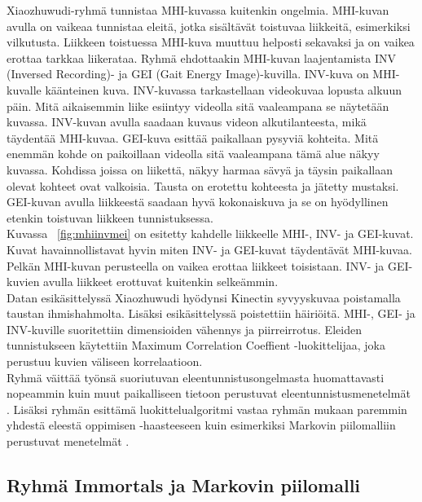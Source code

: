 Xiaozhuwudi-ryhmä tunnistaa MHI-kuvassa kuitenkin ongelmia. MHI-kuvan avulla on vaikeaa tunnistaa eleitä, jotka sisältävät toistuvaa liikkeitä, 
esimerkiksi vilkutusta.
Liikkeen toistuessa MHI-kuva muuttuu helposti sekavaksi ja on vaikea erottaa tarkkaa liikerataa. Ryhmä ehdottaakin MHI-kuvan laajentamista 
INV (Inversed Recording)- ja GEI (Gait Energy Image)-kuvilla. INV-kuva on MHI-kuvalle käänteinen kuva. INV-kuvassa tarkastellaan videokuvaa lopusta alkuun päin.
Mitä aikaisemmin liike esiintyy videolla sitä vaaleampana se näytetään kuvassa. INV-kuvan avulla saadaan kuvaus videon alkutilanteesta, mikä täydentää MHI-kuvaa. 
GEI-kuva esittää paikallaan pysyviä kohteita. Mitä enemmän kohde on paikoillaan videolla sitä vaaleampana tämä alue näkyy kuvassa.
Kohdissa joissa on liikettä, näkyy harmaa sävyä ja täysin paikallaan olevat kohteet ovat valkoisia. Tausta on erotettu kohteesta ja jätetty mustaksi. 
GEI-kuvan avulla liikkeestä saadaan hyvä kokonaiskuva ja se on hyödyllinen etenkin toistuvan liikkeen tunnistuksessa. \citep {6239179} \\

Kuvassa ~\ref{fig:mhiinvmei} on esitetty kahdelle
liikkeelle MHI-, INV- ja GEI-kuvat. Kuvat havainnollistavat hyvin miten INV- ja GEI-kuvat
täydentävät MHI-kuvaa. Pelkän MHI-kuvan perusteella on vaikea erottaa liikkeet toisistaan.
INV- ja GEI-kuvien avulla liikkeet erottuvat kuitenkin selkeämmin. \\

Datan esikäsittelyssä Xiaozhuwudi hyödynsi Kinectin syvyyskuvaa poistamalla taustan ihmishahmolta. Lisäksi esikäsittelyssä poistettiin häiriöitä.
MHI-, GEI- ja INV-kuville suoritettiin dimensioiden vähennys ja piirreirrotus. Eleiden tunnistukseen käytettiin Maximum Correlation Coeffient -luokittelijaa,
joka perustuu kuvien väliseen korrelaatioon. \citep{6239179}\\

Ryhmä väittää työnsä suoriutuvan eleentunnistusongelmasta huomattavasti nopeammin kuin muut paikalliseen tietoon perustuvat eleentunnistusmenetelmät \citep{firstround}.
Lisäksi ryhmän esittämä luokittelualgoritmi vastaa ryhmän mukaan paremmin yhdestä eleestä oppimisen -haasteeseen kuin esimerkiksi Markovin piilomalliin perustuvat menetelmät
\citep{6239179}.

\subsection{Ryhmä Immortals ja Markovin piilomalli}

